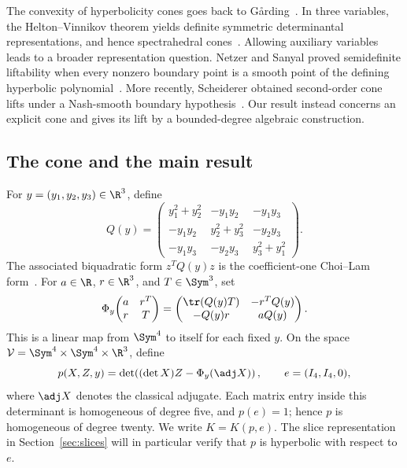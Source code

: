 The convexity of hyperbolicity cones goes back to
G\aa rding~\cite{garding1959}. In three variables, the
Helton--Vinnikov theorem yields definite symmetric determinantal
representations, and hence spectrahedral
cones~\cite{helton-vinnikov2007,lewis-parrilo-ramana2005}.
Allowing auxiliary variables leads to a broader representation question.
Netzer and Sanyal proved semidefinite liftability when every nonzero
boundary point is a smooth point of the defining hyperbolic
polynomial~\cite{netzer-sanyal2015}. More recently, Scheiderer obtained
second-order cone lifts under a Nash-smooth boundary
hypothesis~\cite{scheiderer2025}. Our result instead concerns an explicit
cone and gives its lift by a bounded-degree algebraic construction.

\subsection{The cone and the main result}
For $y=(y_1,y_2,y_3)\in\R^3$, define
\begin{equation}\label{eq:Q}
 Q(y)=\begin{pmatrix}
 y_1^2+y_2^2&-y_1y_2&-y_1y_3\\
 -y_1y_2&y_2^2+y_3^2&-y_2y_3\\
 -y_1y_3&-y_2y_3&y_3^2+y_1^2
 \end{pmatrix}.
\end{equation}
The associated biquadratic form $z^TQ(y)z$ is the coefficient-one
Choi--Lam form~\cite[Section~4]{choi-lam1977}.
For $a\in\R$, $r\in\R^3$, and $T\in\Sym^3$, set
\begin{equation}\label{eq:Phi}
 \Phi_y\!\begin{pmatrix}a&r^T\\r&T\end{pmatrix}
 =\begin{pmatrix}
 \tr(Q(y)T)&-r^TQ(y)\\
 -Q(y)r&aQ(y)
 \end{pmatrix}.
\end{equation}
This is a linear map from $\Sym^4$ to itself for each fixed $y$.
On the space $\mathcal V=\Sym^4\times\Sym^4\times\R^3$, define
\begin{equation}\label{eq:p}
 p(X,Z,y)=\det\!\left((\det X)Z-\Phi_y(\adj X)\right),
 \qquad e=(I_4,I_4,0),
\end{equation}
where $\adj X$ denotes the classical adjugate. Each matrix entry inside
this determinant is homogeneous of degree five, and $p(e)=1$; hence
$p$ is homogeneous of degree twenty. We write $K=K(p,e)$.
The slice representation in Section~\ref{sec:slices} will in particular
verify that $p$ is hyperbolic with respect to $e$.

